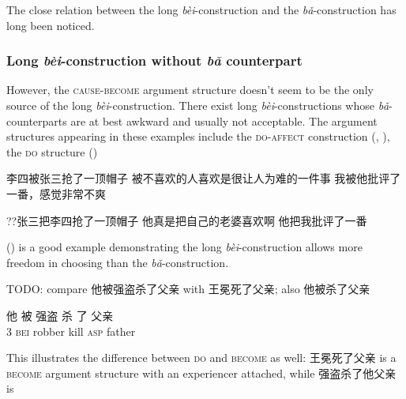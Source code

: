 \documentclass[UTF8, a4paper, oneside, scheme=plain, 12pt]{ctexrep}
\newcommand{\form}[1]{\emph{#1}}
\newcommand*{\category}[1]{\textsc{#1}}
\begin{document}
The close relation between the long \form{bèi}-construction 
and the \form{bǎ}-construction
has long been noticed.

\subsubsection{Long \form{bèi}-construction without \form{bǎ} counterpart}
\label{sec:verb-phrase.bei.no-ba}

However, the \category{cause}-\category{become} argument structure
doesn't seem to be the only source of the long \form{bèi}-construction.
There exist long \form{bèi}-constructions whose \form{bǎ}-counterparts 
are at best awkward and usually not acceptable.
The argument structures appearing in these examples 
include the \category{do}-\category{affect} construction 
(, 
),
the \category{do} structure 
()

\begin{exe}
    \ex\label{ex:verb-phrase.long-bei.no-ba.1} 李四被张三抢了一顶帽子
    \ex\label{ex:verb-phrase.long-bei.no-ba.2} 被不喜欢的人喜欢是很让人为难的一件事
    \ex 我被他批评了一番，感觉非常不爽
\end{exe}

\begin{exe}
    \ex ??张三把李四抢了一顶帽子
    \ex *他真是把自己的老婆喜欢啊
    \ex 他把我批评了一番
\end{exe}

() is a good example 
demonstrating the long \form{bèi}-construction
allows more freedom in choosing 
than the \form{bǎ}-construction.

TODO: compare 他被强盗杀了父亲 with 王冕死了父亲; also 他被杀了父亲

\begin{exe}
    \ex\label{ex:verb-phrase.long-bei.external-possession-1} \gll 他 被 强盗 杀 了 父亲 \\
    3 \category{bei} robber kill \category{asp} father \\
\end{exe}

This illustrates the difference between \category{do} and \category{become} as well: 
王冕死了父亲 is a \category{become} argument structure 
with an experiencer attached,
while 强盗杀了他父亲 is 
\end{document}
